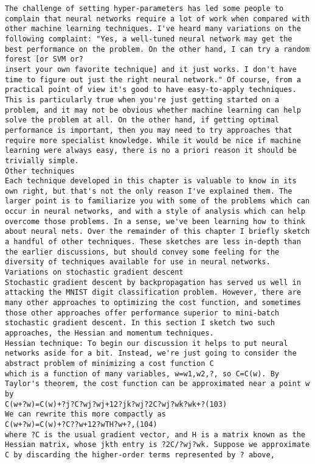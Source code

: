 \begin{lstlisting}
The challenge of setting hyper-parameters has led some people to complain that neural networks require a lot of work when compared with other machine learning techniques. I've heard many variations on the following complaint: "Yes, a well-tuned neural network may get the best performance on the problem. On the other hand, I can try a random forest [or SVM or?
insert your own favorite technique] and it just works. I don't have time to figure out just the right neural network." Of course, from a practical point of view it's good to have easy-to-apply techniques. This is particularly true when you're just getting started on a problem, and it may not be obvious whether machine learning can help solve the problem at all. On the other hand, if getting optimal performance is important, then you may need to try approaches that require more specialist knowledge. While it would be nice if machine learning were always easy, there is no a priori reason it should be trivially simple.
Other techniques
Each technique developed in this chapter is valuable to know in its own right, but that's not the only reason I've explained them. The larger point is to familiarize you with some of the problems which can occur in neural networks, and with a style of analysis which can help overcome those problems. In a sense, we've been learning how to think about neural nets. Over the remainder of this chapter I briefly sketch a handful of other techniques. These sketches are less in-depth than the earlier discussions, but should convey some feeling for the diversity of techniques available for use in neural networks.
Variations on stochastic gradient descent
Stochastic gradient descent by backpropagation has served us well in attacking the MNIST digit classification problem. However, there are many other approaches to optimizing the cost function, and sometimes those other approaches offer performance superior to mini-batch stochastic gradient descent. In this section I sketch two such approaches, the Hessian and momentum techniques.
Hessian technique: To begin our discussion it helps to put neural networks aside for a bit. Instead, we're just going to consider the abstract problem of minimizing a cost function C
which is a function of many variables, w=w1,w2,?, so C=C(w). By Taylor's theorem, the cost function can be approximated near a point w by 
C(w+?w)=C(w)+?j?C?wj?wj+12?jk?wj?2C?wj?wk?wk+?(103)
We can rewrite this more compactly as 
C(w+?w)=C(w)+?C??w+12?wTH?w+?,(104)
where ?C is the usual gradient vector, and H is a matrix known as the Hessian matrix, whose jkth entry is ?2C/?wj?wk. Suppose we approximate C by discarding the higher-order terms represented by ? above, 

\end{lstlisting}
